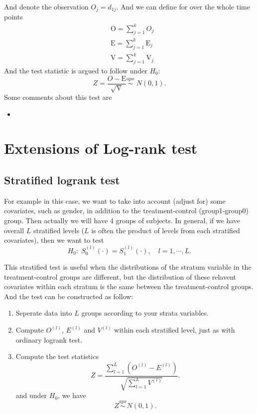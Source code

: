 \documentclass[a4paper,12pt]{article}
\begin{document}
And denote the observation $O_j = d_{1j}$. And we can define for over the whole time points
\[
  \begin{aligned}
    & \mathrm{O} = \sum\limits_{j = 1}^k O_j    \\
    & \mathrm{E} = \sum\limits_{j = 1}^k \mathrm{E}_j    \\
    & \mathrm{V} = \sum\limits_{j = 1}^k \mathrm{V}_j
  \end{aligned}
\]
And the test statistic is argued to follow under $H_0$:
\[
  Z = \frac{O - \mathrm{E}}{\sqrt{\mathrm{V}}}
  \overset{apx}{\sim}\; N\left(0, 1\right).
\]
Some comments about this test are
\begin{itemize}
\item 
\end{itemize}


\section{Extensions of Log-rank test}
\label{sec:extensions-log-rank}

\subsection{Stratified logrank test}
\label{sec:strat-logr-test}

For example in this case, we want to take into account (adjust for) some covariates, such as gender, in addition to the treatment-control (group1-group0) group. Then actually we will have 4 groups of subjects. In general, if we have overall $L$ stratified levels ($L$ is often the product of levels from each stratified covariates), then we want to test
\[
  H_0:\; S_0^{\left(l\right)}\left(\cdot\right) = S_1^{\left(l\right)}\left(\cdot\right)
  ,\quad l = 1, \cdots, L.
\]
\par
This stratified test is useful when the distributions of the stratum variable in the treatment-control groups are different, but the distribution of these relavent covariates within each stratum is the same between the treatment-control groups. And the test can be constructed as follow:

\begin{enumerate}
\item Seperate data into $L$ groups according to your strata variables.
\item Compute $O^{\left(l\right)}$, $E^{\left(l\right)}$ and $V^{\left(l\right)}$ within each stratified level, just as with ordinary logrank test.
\item Compute the test statistics
  \[
    Z = \frac{\sum\limits_{l = 1}^L\left(O^{\left(l\right)} - E^{\left(l\right)}\right)}{
      \sqrt{\sum\limits_{l = 1}^L V^{\left(l\right)}}
    }.
  \]
  and under $H_0$, we have
  \[
    Z \overset{apx}{\sim} N\left(0, 1\right)
    .
  \]
\end{enumerate}
\end{document}
